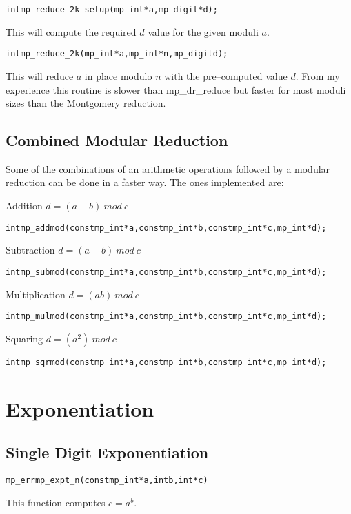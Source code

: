 \documentclass[synpaper]{book}
\def\mod{{\mathit\ mod\ }}
\begin{document}
\begin{alltt}
int mp_reduce_2k_setup(mp_int *a, mp_digit *d);
\end{alltt}

This will compute the required $d$ value for the given moduli $a$.

\begin{alltt}
int mp_reduce_2k(mp_int *a, mp_int *n, mp_digit d);
\end{alltt}

This will reduce $a$ in place modulo $n$ with the pre--computed value $d$.  From my experience this routine is
slower than mp\_dr\_reduce but faster for most moduli sizes than the Montgomery reduction.

\section{Combined Modular Reduction}

Some of the combinations of an arithmetic operations followed by a modular reduction can be done in a faster way. The ones implemented are:

Addition $d = (a + b) \mod c$
\begin{alltt}
int mp_addmod(const mp_int *a, const mp_int *b, const mp_int *c, mp_int *d);
\end{alltt}

Subtraction  $d = (a - b) \mod c$
\begin{alltt}
int mp_submod(const mp_int *a, const mp_int *b, const mp_int *c, mp_int *d);
\end{alltt}

Multiplication $d = (ab) \mod c$
\begin{alltt}
int mp_mulmod(const mp_int *a, const mp_int *b, const mp_int *c, mp_int *d);
\end{alltt}

Squaring  $d = (a^2) \mod c$
\begin{alltt}
int mp_sqrmod(const mp_int *a, const mp_int *b, const mp_int *c, mp_int *d);
\end{alltt}



\chapter{Exponentiation}
\section{Single Digit Exponentiation}
\begin{alltt}
mp_err mp_expt_n(const mp_int *a, int b, int *c)
\end{alltt}
This function computes $c = a^b$.
\end{document}
